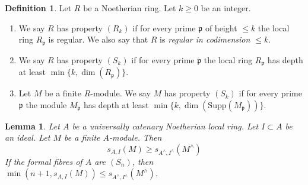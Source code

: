 \documentclass{amsart}
\theoremstyle{plain}
\newtheorem{lemma}[subsection]{Lemma}
\theoremstyle{definition}
\newtheorem{definition}[subsection]{Definition}
\theoremstyle{remark}
\numberwithin{equation}{subsection}
\begin{document}
\begin{definition}
\label{algebra-definition-conditions}
Let $R$ be a Noetherian ring.
Let $k \geq 0$ be an integer.
\begin{enumerate}
\item We say $R$ has property {\it $(R_k)$} if for every prime $\mathfrak p$
of height $\leq k$ the local ring $R_{\mathfrak p}$ is regular.
We also say that $R$ is {\it regular in codimension $\leq k$}.
\item We say $R$ has property {\it $(S_k)$} if for every prime $\mathfrak p$
the local ring $R_{\mathfrak p}$ has depth at least
$\min\{k, \dim(R_{\mathfrak p})\}$.
\item Let $M$ be a finite $R$-module. We say $M$ has property $(S_k)$
if for every prime $\mathfrak p$ the module
$M_{\mathfrak p}$ has depth at least
$\min\{k, \dim(\text{Supp}(M_{\mathfrak p}))\}$.
\end{enumerate}
\end{definition}

\begin{lemma}
\label{lemma-cutoff-completion}
Let $A$ be a universally catenary Noetherian local ring.
Let $I \subset A$ be an ideal. Let $M$ be
a finite $A$-module. Then
$$
s_{A, I}(M) \geq s_{A^\wedge, I^\wedge}(M^\wedge)
$$
If the formal fibres of $A$ are $(S_n)$, then
$\min(n + 1, s_{A, I}(M)) \leq s_{A^\wedge, I^\wedge}(M^\wedge)$.
\end{lemma}
\end{document}
